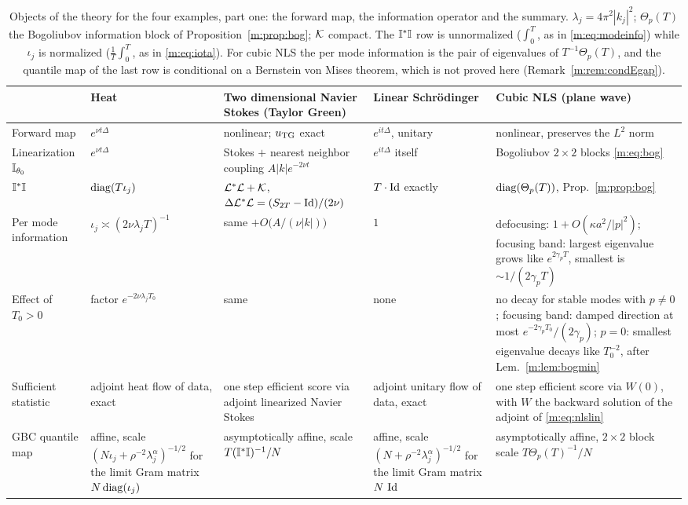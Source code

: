 \begin{table}[tp]\centering\scriptsize
\setlength{\tabcolsep}{2pt}
\caption{Objects of the theory for the four examples, part one: the forward map, the information operator and the summary. $\lambda_j=4\pi^2|k_j|^2$; $\Theta_p(T)$ the Bogoliubov information block of Proposition~\ref{m:prop:bog}; $\mathcal{K}$ compact. The $\mathbb{I}^*\mathbb{I}$ row is unnormalized ($\int_0^T$, as in \eqref{m:eq:modeinfo}) while $\iota_j$ is normalized ($\tfrac1T\int_0^T$, as in \eqref{m:eq:iota}). For cubic NLS the per mode information is the pair of eigenvalues of $T^{-1}\Theta_p(T)$, and the quantile map of the last row is conditional on a Bernstein von Mises theorem, which is not proved here (Remark~\ref{m:rem:condEgap}).}\label{m:tab:compare}
\begin{tabular}{>{\raggedright\arraybackslash}p{}>{\raggedright\arraybackslash}p{}>{\raggedright\arraybackslash}p{}>{\raggedright\arraybackslash}p{}>{\raggedright\arraybackslash}p{}}
\toprule
& Heat & Two dimensional Navier Stokes (Taylor Green) & Linear Schr\"odinger & Cubic NLS (plane wave)\\
\midrule
Forward map & $e^{\nu t\Delta}$ & nonlinear; $u_{\rm TG}$ exact & $e^{it\Delta}$, unitary & nonlinear, preserves the $L^2$ norm\\
Linearization $\mathbb{I}_{\theta_0}$ & $e^{\nu t\Delta}$ & Stokes $+$ nearest neighbor coupling $A|k|e^{-2\nu t}$ & $e^{it\Delta}$ itself & Bogoliubov $2\times2$ blocks \eqref{m:eq:bog}\\
$\mathbb{I}^*\mathbb{I}$ & $\operatorname{diag}(T\iota_j)$ & $\mathcal{L}^*\mathcal{L}+\mathcal{K}$, $\Delta\mathcal{L}^*\mathcal{L}=(S_{2T}-\operatorname{Id})/(2\nu)$ & $T\cdot\operatorname{Id}$ exactly & $\operatorname{diag}(\Theta_p(T))$, Prop.~\ref{m:prop:bog}\\
Per mode information & $\iota_j\asymp(2\nu\lambda_jT)^{-1}$ & same $+O\big(A/(\nu|k|)\big)$ & $1$ & defocusing: $1+O(\kappa a^2/|p|^2)$; focusing band: largest eigenvalue grows like $e^{2\gamma_pT}$, smallest is $\sim1/(2\gamma_pT)$\\
Effect of $T_0>0$ & factor $e^{-2\nu\lambda_jT_0}$ & same & none & no decay for stable modes with $p\ne0$; focusing band: damped direction at most $e^{-2\gamma_pT_0}/(2\gamma_p)$; $p=0$: smallest eigenvalue decays like $T_0^{-2}$, after Lem.~\ref{m:lem:bogmin}\\
Sufficient statistic & adjoint heat flow of data, exact & one step efficient score via adjoint linearized Navier Stokes & adjoint unitary flow of data, exact & one step efficient score via $W(0)$, with $W$ the backward solution of the adjoint of \eqref{m:eq:nlslin}\\
GBC quantile map & affine, scale $(N\iota_j+\rho^{-2}\lambda_j^\alpha)^{-1/2}$ for the limit Gram matrix $N\operatorname{diag}(\iota_j)$ & asymptotically affine, scale $T(\mathbb{I}^*\mathbb{I})^{-1}/N$ & affine, scale $(N+\rho^{-2}\lambda_j^\alpha)^{-1/2}$ for the limit Gram matrix $N\,\operatorname{Id}$ & asymptotically affine, $2\times2$ block scale $T\Theta_p(T)^{-1}/N$\\
\bottomrule
\end{tabular}
\end{table}

